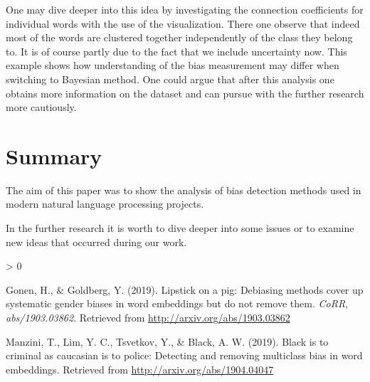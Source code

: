 \documentclass[
  12pt,
]{book}
\newlength{\cslhangindent}
\newenvironment{CSLReferences}[2] %
 {%
  \setlength{\parindent}{0pt}
  \ifodd #1 \everypar{\setlength{\hangindent}{\cslhangindent}}\ignorespaces\fi
  \ifnum #2 > 0
  \setlength{\parskip}{#2\baselineskip}
  \fi
 }%
 {}
\begin{document}
One may dive deeper into this idea by investigating the connection coefficients for individual words with the use of the visualization. There one observe that indeed most of the words are clustered together independently of the class they belong to. It is of course partly due to the fact that we include uncertainty now. This example shows how understanding of the bias measurement may differ when switching to Bayesian method. One could argue that after this analysis one obtains more information on the dataset and can pursue with the further research more cautiously.

\hypertarget{summary}{%
\chapter{Summary}\label{summary}}

The aim of this paper was to show the analysis of bias detection methods used in modern natural language processing projects.

In the further research it is worth to dive deeper into some issues or to examine new ideas that occurred during our work.

\hypertarget{refs}{}
\begin{CSLReferences}{1}{0}
\leavevmode\hypertarget{ref-Gonen2019Lipstick}{}%
Gonen, H., \& Goldberg, Y. (2019). Lipstick on a pig: Debiasing methods cover up systematic gender biases in word embeddings but do not remove them. \emph{CoRR}, \emph{abs/1903.03862}. Retrieved from \url{http://arxiv.org/abs/1903.03862}

\leavevmode\hypertarget{ref-Manzini2019blackToCriminal}{}%
Manzini, T., Lim, Y. C., Tsvetkov, Y., \& Black, A. W. (2019). Black is to criminal as caucasian is to police: Detecting and removing multiclass bias in word embeddings. Retrieved from \url{http://arxiv.org/abs/1904.04047}

\end{CSLReferences}
\end{document}
